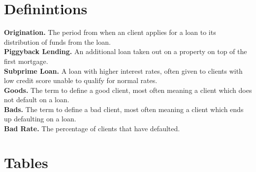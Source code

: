 \begin{appendices}
\chapter{Definintions}

\textbf{Origination.} The period from when an client applies for a loan to its distribution of funds from the loan.\\

\textbf{Piggyback Lending.} An additional loan taken out on a property on top of the first mortgage.\\

\textbf{Subprime Loan.} A loan with higher interest rates, often given to clients with low credit score unable to qualify for normal rates. \\

\textbf{Goods.} The term to define a good client, most often meaning a client which does not default on a loan.\\

\textbf{Bads.} The term to define a bad client, most often meaning a client which ends up defaulting on a loan.\\

\textbf{Bad Rate.} The percentage of clients that have defaulted.\\

\chapter{Tables}


\end{appendices}

